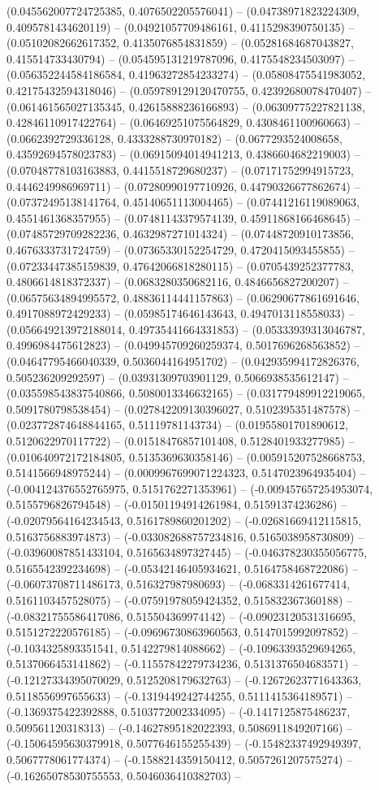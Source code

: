 (0.045562007724725385, 0.4076502205576041) -- (0.04738971823224309, 0.4095781434620119) -- (0.04921057709486161, 0.4115298390750135) -- (0.05102082662617352, 0.4135076854831859) -- (0.05281684687043827, 0.415514733430794) -- (0.054595131219787096, 0.4175548234503097) -- (0.056352244584186584, 0.41963272854233274) -- (0.05808475541983052, 0.42175432594318046) -- (0.059789129120470755, 0.42392680078470407) -- (0.061461565027135345, 0.42615888236166893) -- (0.06309775227821138, 0.42846110917422764) -- (0.06469251075564829, 0.4308461100960663) -- (0.0662392729336128, 0.4333288730970182) -- (0.0677293524008658, 0.43592694578023783) -- (0.06915094014941213, 0.4386604682219003) -- (0.07048778103163883, 0.4415518729680237) -- (0.07171752994915723, 0.4446249986969711) -- (0.07280990197710926, 0.44790326677862674) -- (0.07372495138141764, 0.45140651113004465) -- (0.07441216119089063, 0.4551461368357955) -- (0.07481143379574139, 0.45911868166468645) -- (0.07485729709282236, 0.4632987271014324) -- (0.07448720910173856, 0.4676333731724759) -- (0.07365330152254729, 0.4720415093455855) -- (0.07233447385159839, 0.47642066818280115) -- (0.0705439252377783, 0.4806614818372337) -- (0.0683280350682116, 0.4846656827200207) -- (0.06575634894995572, 0.48836114441157863) -- (0.06290677861691646, 0.4917088972429233) -- (0.05985174646143643, 0.4947013118558033) -- (0.056649213972188014, 0.49735441664331853) -- (0.05333939313046787, 0.4996984475612823) -- (0.049945709260259374, 0.5017696268563852) -- (0.04647795466040339, 0.5036044164951702) -- (0.042935994172826376, 0.505236209292597) -- (0.03931309703901129, 0.5066938535612147) -- (0.035598543837540866, 0.5080013346632165) -- (0.031779489912219065, 0.5091780798538454) -- (0.027842209130396027, 0.5102395351487578) -- (0.023772874648844165, 0.51119781143734) -- (0.01955801701890612, 0.5120622970117722) -- (0.01518476857101408, 0.5128401933277985) -- (0.010640972172184805, 0.5135369630358146) -- (0.005915207528668753, 0.5141566948975244) -- (0.0009967699071224323, 0.5147023964935404) -- (-0.004124376552765975, 0.5151762271353961) -- (-0.009457657254953074, 0.5155796826794548) -- (-0.01501194914261984, 0.51591374236286) -- (-0.02079564164234543, 0.5161789860201202) -- (-0.02681669412115815, 0.5163756883974873) -- (-0.033082688757234816, 0.5165038958730809) -- (-0.03960087851433104, 0.5165634897327445) -- (-0.046378230355056775, 0.5165542392234698) -- (-0.05342146405934621, 0.5164758468722086) -- (-0.06073708711486173, 0.516327987980693) -- (-0.0683314261677414, 0.5161103457528075) -- (-0.07591978059424352, 0.515832367360188) -- (-0.08321755586417086, 0.515504369974142) -- (-0.09023120531316695, 0.5151272220576185) -- (-0.09696730863960563, 0.5147015992097852) -- (-0.1034325893351541, 0.5142279814088662) -- (-0.10963393529694265, 0.5137066453141862) -- (-0.11557842279734236, 0.5131376504683571) -- (-0.12127334395070029, 0.5125208179632763) -- (-0.12672623771643363, 0.5118556997655633) -- (-0.1319449242744255, 0.5111415364189571) -- (-0.1369375422392888, 0.5103772002334095) -- (-0.1417125875486237, 0.509561120318313) -- (-0.14627895182022393, 0.5086911849207166) -- (-0.15064595630379918, 0.5077646155255439) -- (-0.15482337492949397, 0.5067778061774374) -- (-0.1588214359150412, 0.5057261207575274) -- (-0.16265078530755553, 0.5046036410382703) -- 